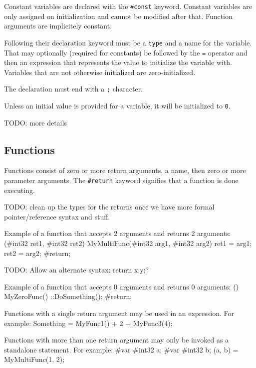 \documentclass{article}
\newcommand{\code}[1]{\colorbox{light-gray}{\texttt{#1}}}
\newenvironment{codebox} {\snugshade\verbatim} {\endverbatim\endsnugshade}
\begin{document}
Constant variables are declared with the \code{\#const} keyword.  Constant variables are only assigned on initialization and cannot be modified after that.  Function arguments are implicitely constant.

Following their declaration keyword must be a \code{type} and a name for the variable.  That may optionally (required for constants) be followed by the \code{=} operator and then an expression that represents the value to initialize the variable with.  Variables that are not otherwise initialized are zero-initialized.

The declaration must end with a \code{;} character.

Unless an initial value is provided for a variable, it will be initialized to \code{0}.

TODO: more details

\subsection{Functions}

Functions consist of zero or more return arguments, a name, then zero or more parameter arguments.  The \code{\#return} keyword signifies that a function is done executing.

TODO: clean up the types for the returns once we have more formal pointer/reference syntax and stuff.

Example of a function that accepts 2 arguments and returns 2 arguments:
\begin{codebox}
(#int32 ret1, #int32 ret2) MyMultiFunc(#int32 arg1, #int32 arg2)
{
    ret1 = arg1;
    ret2 = arg2;
    #return;
}
\end{codebox}

TODO: Allow an alternate syntax: return x,y;?

Example of a function that accepts 0 arguments and returns 0 arguments:
\begin{codebox}
() MyZeroFunc()
{
    ::DoSomething();
    #return;
}
\end{codebox}

Functions with a single return argument may be used in an expression.  For example:
\begin{codebox}
Something = MyFunc1() + 2 + MyFunc3(4);
\end{codebox}

Functions with more than one return argument may only be invoked as a standalone statement.  For example:
\begin{codebox}
#var #int32 a;
#var #int32 b;
(a, b) = MyMultiFunc(1, 2);
\end{codebox}
\end{document}
